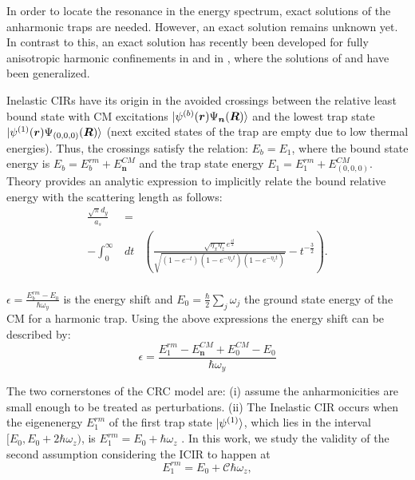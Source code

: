 \documentclass[aps,pre,twocolumn,superscriptaddress,showpacs]{revtex4-1}
\newcommand{\bfeq}[1]{{\boldsymbol{#1}}}
\begin{document}
	In order to locate the resonance in the energy spectrum, exact solutions of the anharmonic traps are needed. However, an exact solution remains 		unknown yet. In contrast to this, an exact solution has recently been developed for fully anisotropic harmonic confinements in 			\cite{PhysRevA.101.053624} and in \cite{PhysRevA.102.013314}, where the solutions of \cite{PhysRevA.74.022712} and \cite{Liang_2008} have been 	generalized. 
	
	Inelastic CIRs have its origin in the avoided crossings between the relative least bound state with CM excitations $\ket{\psi^{(b)}(\bfeq{r}) \Psi_{\bfeq{n}} (\bfeq{R})}$ and the lowest trap state $\ket{\psi^{(1)}(\bfeq{r}) \Psi_{(0,0,0)} (\bfeq{R})}$ (next excited states of the trap are empty due to low thermal energies).  Thus, the crossings satisfy the relation: $E_b = E_1$, where the bound state energy is $E_b = E^{rm}_b + E^{CM}_{\bfeq{n}}$ and the trap state energy $E_1 = E^{rm}_1 + E^{CM}_{(0,0,0)}$. Theory provides an analytic expression to implicitly relate the bound relative energy with the scattering length as follows:
	\begin{eqnarray}
		\frac{\sqrt{\pi} d_y}{a_s} &=& \nonumber \\
		 - \int^\infty_0 &dt& \left( \frac{\sqrt{\eta_x \eta_z} e^{\frac{\epsilon t}{2}}}{\sqrt{(1 - e^{-t}) (1 - e^{-\eta_x t}) (1 - e^{-\eta_z t})} } - t^{-\frac{3}{2}}\right). \nonumber \\
	\label{eq:ascE}
	\end{eqnarray}
	
	$\epsilon = \frac{E^{rm}_b - E_0}{\hbar \omega_y}$ is the energy shift and $E_0 = \frac{\hbar}{2}\sum_j \omega_j $ the ground state energy of the CM for a harmonic trap. Using the above expressions the energy shift can be described by:
	\begin{equation}
		\epsilon = \frac{E^{rm}_1 - E^{CM}_{\bfeq{n}} + E^{CM}_0 - E_0}{\hbar \omega_y}
		\label{eq:Energy shift}
	\end{equation}
	
	The two cornerstones of the CRC model are: (i) assume the anharmonicities are small enough to be treated as perturbations. (ii) The Inelastic CIR occurs when the eigenenergy $E^{rm}_1$ of the first trap state $\ket{\psi^{(1)}}$, which lies in the interval $[E_0, E_0 + 2\hbar \omega_z)$, is $E^{rm}_1 = E_0 + \hbar \omega_z$ \cite{PhysRevLett.109.073201}. In this work, we study the validity of the second assumption considering the ICIR to happen at
	\begin{equation}
		E^{rm}_1 = E_0 + \mathcal{C} \hbar \omega_z,
		\label{eq:C equation}
	\end{equation}
	
\end{document}

